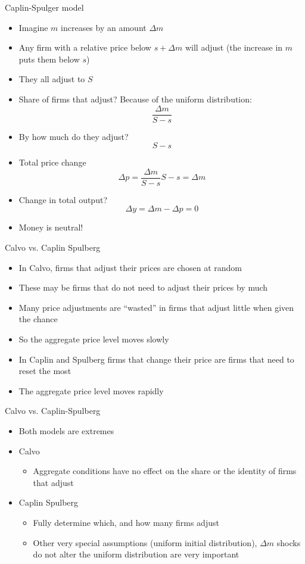 \documentclass[11pt,aspectratio=169,xcolor={dvipsnames},hyperref={pdftex,pdfpagemode=UseNone,hidelinks,pdfdisplaydoctitle=true},usepdftitle=false]{beamer}
\begin{document}
\begin{frame}{Caplin-Spulger model}
\begin{itemize}
\item Imagine $m$ increases by an amount $\Delta m$
\item Any firm with a relative price below $s + \Delta m$ will adjust (the increase in $m$ puts them below $s$)
\item They all adjust to $S$
\item Share of firms that adjust? Because of the uniform distribution:
$$\frac{\Delta m}{S-s}$$
\item By how much do they adjust?
$$S-s$$
\item Total price change
$$\Delta p = \frac{\Delta m}{S-s} S-s = \Delta m$$
\item Change in total output?
$$\Delta y = \Delta m - \Delta p = 0$$
\item Money is neutral!
\end{itemize}
\end{frame}

\begin{frame}{Calvo vs. Caplin Spulberg}
\begin{itemize}
\item In Calvo, firms that adjust their prices are chosen at random
\item These may be firms that do not need to adjust their prices by much
\item Many price adjustments are ``wasted'' in firms that adjust little when given the chance
\item So the aggregate price level moves slowly
\item In Caplin and Spulberg firms that change their price are firms that need to reset the most
\item The aggregate price level moves rapidly
\end{itemize}
\end{frame}


\begin{frame}{Calvo vs. Caplin-Spulberg}
\begin{itemize}
\item Both models are extremes
\item Calvo
\begin{itemize}
\item Aggregate conditions have no effect on the share or the identity of firms that adjust
\end{itemize}
\item Caplin Spulberg
\begin{itemize}
\item Fully determine which, and how many firms adjust
\item Other very special assumptions (uniform initial distribution), $\Delta m$ shocks do not alter the uniform distribution are very important
\end{itemize}
\end{itemize}
\end{frame}
\end{document}

